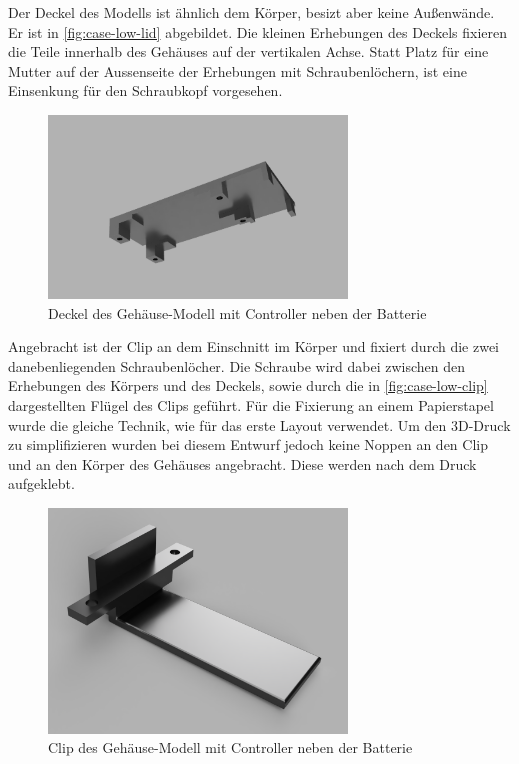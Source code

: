 Der Deckel des Modells ist ähnlich dem Körper, besizt aber keine Außenwände.
Er ist in \autoref{fig:case-low-lid} abgebildet.
Die kleinen Erhebungen des Deckels fixieren die Teile innerhalb des Gehäuses auf der vertikalen Achse.
Statt Platz für eine Mutter auf der Aussenseite der Erhebungen mit Schraubenlöchern, ist eine Einsenkung für den Schraubkopf vorgesehen.

\begin{figure}[htbp]
	\includegraphics[width=300px]{images/case/low_lid.png}
	\centering
	\caption{Deckel des Gehäuse-Modell mit Controller neben der Batterie}
	\label{fig:case-low-lid}
\end{figure}

Angebracht ist der Clip an dem Einschnitt im Körper und fixiert durch die zwei danebenliegenden Schraubenlöcher.
Die Schraube wird dabei zwischen den Erhebungen des Körpers und des Deckels, sowie durch die in
\autoref{fig:case-low-clip} dargestellten Flügel des Clips geführt.
Für die Fixierung an einem Papierstapel wurde die gleiche Technik, wie für das erste Layout verwendet.
Um den 3D-Druck zu simplifizieren wurden bei diesem Entwurf jedoch keine Noppen an den Clip und an
den Körper des Gehäuses angebracht. Diese werden nach dem Druck aufgeklebt.

\begin{figure}[htbp]
	\includegraphics[width=300px]{images/case/low_clip.png}
	\centering
	\caption{Clip des Gehäuse-Modell mit Controller neben der Batterie}
	\label{fig:case-low-clip}
\end{figure}


